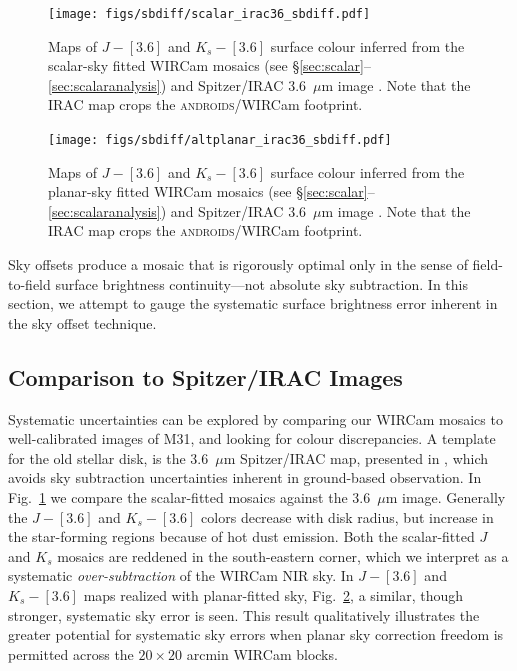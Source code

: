 \documentclass[iop]{emulateapj}
\newcommand{\androids}{\textsc{androids}}
\newcommand{\Fig}[1]{Fig.~\ref{fig:#1}}  %
\begin{document}
\begin{figure}[t]
    \centering
        \texttt{[image: figs/sbdiff/scalar\_irac36\_sbdiff.pdf]}
    \caption{Maps of $J-[3.6]$ and $K_s-[3.6]$ surface colour inferred from the scalar-sky fitted WIRCam mosaics (see \S\ref{sec:scalar}--\ref{sec:scalaranalysis}) and Spitzer/IRAC 3.6~$\mu$m image \citep{Barmby:2006}. Note that the IRAC map crops the \androids/WIRCam footprint.}
    \label{fig:scalar_irac36_sbdiff}
\end{figure}

\begin{figure}[t]
    \centering
        \texttt{[image: figs/sbdiff/altplanar\_irac36\_sbdiff.pdf]}
    \caption{Maps of $J-[3.6]$ and $K_s-[3.6]$ surface colour inferred from the planar-sky fitted WIRCam mosaics (see \S\ref{sec:scalar}--\ref{sec:scalaranalysis}) and Spitzer/IRAC 3.6~$\mu$m image \citep{Barmby:2006}. Note that the IRAC map crops the \androids/WIRCam footprint.}
    \label{fig:altplanar_irac36_sbdiff}
\end{figure}

Sky offsets produce a mosaic that is rigorously optimal only in the sense of field-to-field surface brightness continuity---not absolute sky subtraction. In this section, we attempt to gauge the systematic surface brightness error inherent in the sky offset technique.

\subsection{Comparison to Spitzer/IRAC Images}

Systematic uncertainties can be explored by comparing our WIRCam mosaics to well-calibrated images of M31, and looking for colour discrepancies.
A template for the old stellar disk, is the 3.6~$\mu$m Spitzer/IRAC map, presented in \cite{Barmby:2006}, which avoids sky subtraction uncertainties inherent in ground-based observation.
In \Fig{scalar_irac36_sbdiff} we compare the scalar-fitted mosaics against the 3.6~$\mu$m image. Generally the $J-[3.6]$ and $K_s-[3.6]$ colors decrease with disk radius, but increase in the star-forming regions because of hot dust emission. Both the scalar-fitted $J$ and $K_s$ mosaics are reddened in the south-eastern corner, which we interpret as a systematic \emph{over-subtraction} of the WIRCam NIR sky. In $J-[3.6]$ and $K_s-[3.6]$ maps realized with planar-fitted sky, \Fig{altplanar_irac36_sbdiff}, a similar, though stronger, systematic sky error is seen. This result qualitatively illustrates the greater potential for systematic sky errors when planar sky correction freedom is permitted across the $20\times 20$ arcmin WIRCam blocks.
\end{document}
